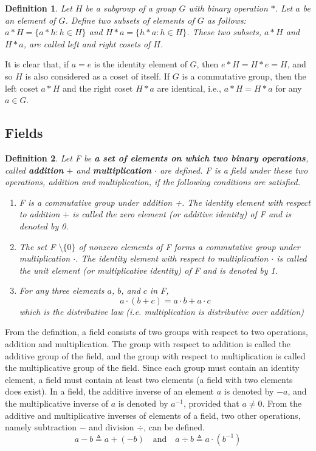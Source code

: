 \documentclass[11pt]{article}
\newtheorem{definition}{Definition}
\begin{document}
\begin{definition}
  Let $H$ be a subgroup of a group $G$ with binary operation $\ast$. 
  Let $a$ be an element of $G$. Define two subsets of elements of $G$ as follows: $a \ast H = \{ a \ast h: h \in H \}$ and $H \ast a = \{ h \ast a: h \in H \}$. These two subsets, $a \ast H$ and $H \ast a$, are called left and right cosets of $H$.
\end{definition}

It is clear that, if $a = e$ is the identity element of $G$, then $e \ast H = H \ast e = H$, and so $H$ is also considered as a coset of itself. If $G$ is a commutative group, then the left coset $a \ast H$ and the right coset $H \ast a$ are identical, i.e., $a \ast H = H \ast a$ for any $a \in G$.

\subsection{Fields}
\begin{definition}
Let F be \textbf{a set of elements on which two binary operations}, called \textbf{addition} $+$ and \textbf{multiplication} $\cdot$ are defined. 
F is a field under these two operations, addition and multiplication, if the following conditions are satisfied.
\begin{enumerate}
  \item F is a commutative group under addition +. The identity element with respect to addition $+$ is called the zero element (or additive identity) of F and is denoted by 0.
  \item The set F $\setminus \{ 0 \}$ of nonzero elements of F forms a commutative group under multiplication $\cdot$. The identity element with respect to multiplication $\cdot$ is called the unit element (or multiplicative identity) of F and is denoted by 1.
  \item For any three elements $a$, $b$, and $c$ in F,
  \[
  a \cdot (b + c) = a \cdot b + a \cdot c
  \]
  which is the distributive law (i.e. multiplication is distributive over addition)
\end{enumerate}
\end{definition}

From the definition, a field consists of two groups with respect to two operations, addition and multiplication. The group with respect to addition is called the additive group of the field, and the group with respect to multiplication is called the multiplicative group of the field. 
Since each group must contain an identity element, a field must contain at least two elements (a field with two elements does exist). 
In a field, the additive inverse of an element $a$ is denoted by $-a$, and the multiplicative inverse of $a$ is denoted by $a^{−1}$, provided that $a \neq 0$.
From the additive and multiplicative inverses of elements of a field, two other operations, namely subtraction $-$ and division $\div$, can be defined.
\[
a - b \triangleq a + (-b) \quad \text{and} \quad a \div b \triangleq a \cdot (b^{-1})
\]
\end{document}
